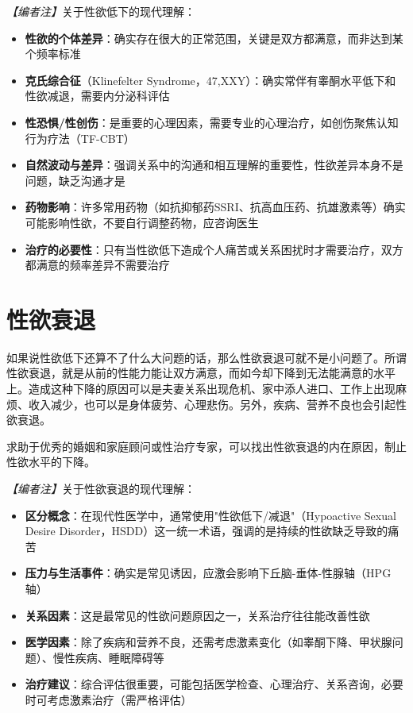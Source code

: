 \noindent\textit{【编者注】}关于性欲低下的现代理解：
\begin{itemize}
	\item \textbf{性欲的个体差异}：确实存在很大的正常范围，关键是双方都满意，而非达到某个频率标准
	\item \textbf{克氏综合征}（Klinefelter Syndrome，47,XXY）：确实常伴有睾酮水平低下和性欲减退，需要内分泌科评估
	\item \textbf{性恐惧/性创伤}：是重要的心理因素，需要专业的心理治疗，如创伤聚焦认知行为疗法（TF-CBT）
	\item \textbf{自然波动与差异}：强调关系中的沟通和相互理解的重要性，性欲差异本身不是问题，缺乏沟通才是
	\item \textbf{药物影响}：许多常用药物（如抗抑郁药SSRI、抗高血压药、抗雄激素等）确实可能影响性欲，不要自行调整药物，应咨询医生
	\item \textbf{治疗的必要性}：只有当性欲低下造成个人痛苦或关系困扰时才需要治疗，双方都满意的频率差异不需要治疗
\end{itemize}

\section{性欲衰退}

如果说性欲低下还算不了什么大问题的话，那么性欲衰退可就不是小问题了。所谓性欲衰退，就是从前的性能力能让双方满意，而如今却下降到无法能满意的水平上。造成这种下降的原因可以是夫妻关系出现危机、家中添人进口、工作上出现麻烦、收入减少，也可以是身体疲劳、心理悲伤。另外，疾病、营养不良也会引起性欲衰退。

求助于优秀的婚姻和家庭顾问或性治疗专家，可以找出性欲衰退的内在原因，制止性欲水平的下降。

\noindent\textit{【编者注】}关于性欲衰退的现代理解：
\begin{itemize}
	\item \textbf{区分概念}：在现代性医学中，通常使用"性欲低下/减退"（Hypoactive Sexual Desire Disorder，HSDD）这一统一术语，强调的是持续的性欲缺乏导致的痛苦
	\item \textbf{压力与生活事件}：确实是常见诱因，应激会影响下丘脑-垂体-性腺轴（HPG轴）
	\item \textbf{关系因素}：这是最常见的性欲问题原因之一，关系治疗往往能改善性欲
	\item \textbf{医学因素}：除了疾病和营养不良，还需考虑激素变化（如睾酮下降、甲状腺问题）、慢性疾病、睡眠障碍等
	\item \textbf{治疗建议}：综合评估很重要，可能包括医学检查、心理治疗、关系咨询，必要时可考虑激素治疗（需严格评估）
\end{itemize}

